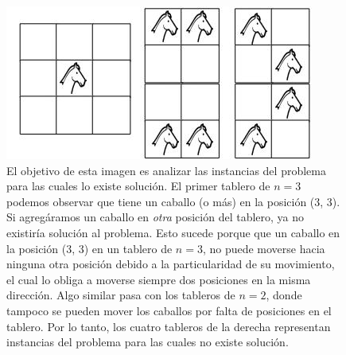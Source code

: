 \documentclass[a4paper]{article}
\begin{document}
\begin{figure}
\centering
\includegraphics[scale=0.7]{instsinsol.jpg}\caption{El objetivo de esta imagen es analizar las instancias del problema para las cuales lo existe solución. El primer tablero de $n = 3$ podemos observar que tiene un caballo (o más) en la posición (3, 3). Si agregáramos un caballo en \textit{otra} posición del tablero, ya no existiría solución al problema. Esto sucede porque que un caballo en la posición (3, 3) en un tablero de $n = 3$, no puede moverse hacia ninguna otra posición debido a la particularidad de su movimiento, el cual lo obliga a moverse siempre dos posiciones en la misma dirección. Algo similar pasa con los tableros de $n = 2$, donde tampoco se pueden mover los caballos por falta de posiciones en el tablero. Por lo tanto, los cuatro tableros de la derecha representan instancias del problema para las cuales no existe solución.}
\end{figure}
\end{document}
